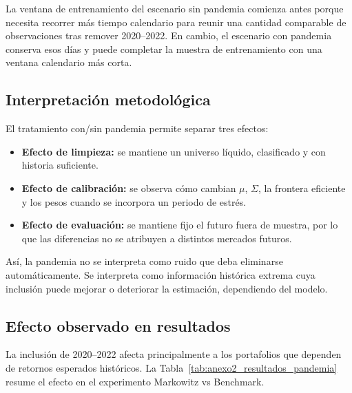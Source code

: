 La ventana de entrenamiento del escenario sin pandemia comienza antes porque
necesita recorrer más tiempo calendario para reunir una cantidad comparable de
observaciones tras remover 2020--2022. En cambio, el escenario con pandemia
conserva esos días y puede completar la muestra de entrenamiento con una
ventana calendario más corta.

\subsection*{Interpretación metodológica}

El tratamiento con/sin pandemia permite separar tres efectos:

\begin{itemize}
  \item \textbf{Efecto de limpieza:} se mantiene un universo líquido,
        clasificado y con historia suficiente.
  \item \textbf{Efecto de calibración:} se observa cómo cambian $\mu$,
        $\Sigma$, la frontera eficiente y los pesos cuando se incorpora un
        periodo de estrés.
  \item \textbf{Efecto de evaluación:} se mantiene fijo el futuro fuera de
        muestra, por lo que las diferencias no se atribuyen a distintos
        mercados futuros.
\end{itemize}

Así, la pandemia no se interpreta como ruido que deba eliminarse
automáticamente. Se interpreta como información histórica extrema cuya
inclusión puede mejorar o deteriorar la estimación, dependiendo del modelo.

\subsection*{Efecto observado en resultados}

La inclusión de 2020--2022 afecta principalmente a los portafolios que dependen
de retornos esperados históricos. La Tabla~\ref{tab:anexo2_resultados_pandemia}
resume el efecto en el experimento Markowitz vs Benchmark.


